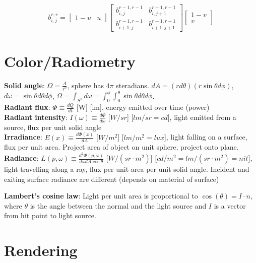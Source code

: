 \documentclass[9pt,landscape]{extarticle}
\begin{document}
\begin{multicols}{3}
$$b_{i,j}^{r,r} =
\begin{bmatrix}
    1 - u & u
\end{bmatrix}
\begin{bmatrix}
    b_{i, j}^{r-1, r-1} & b_{i, j+1}^{r-1, r-1} \\
    b_{i+1, j}^{r-1, r-1} & b_{i+1, j+1}^{r-1, r-1}
\end{bmatrix}
\begin{bmatrix}
    1 - v \\
    v
\end{bmatrix}$$


\section{Color/Radiometry}

\textbf{Solid angle}: $\Omega = \frac{A}{r^2}$, sphere has $4\pi$ steradians. $dA = (r d\theta)(r \sin\theta d\phi)$, $d\omega = \sin\theta d\theta d\phi$, $\Omega = \int_{S^2} d\omega = \int_0^{\phi} \int_0^{\theta} \sin\theta d\theta d\phi$. \\
\textbf{Radiant flux}: $\Phi \equiv \frac{dQ}{dt}$ [W] [lm], energy emitted over time (power) \\
\textbf{Radiant intensity}: $I(\omega) \equiv \frac{d\Phi}{d\omega}$ [$W/sr$] [$lm/sr=cd$], light emitted from a source, flux per unit solid angle \\
\textbf{Irradiance}: $E(x) \equiv \frac{d\Phi(x)}{dA}$ [$W/m^2$] [$lm/m^2=lux$], light falling on a surface, flux per unit area. Project area of object on unit sphere, project onto plane. \\
\textbf{Radiance}: $L(p, \omega) \equiv \frac{d^2\Phi(p, \omega)}{d\omega dA \cos\theta}$ [$W/(sr\cdot m^2)$] [$cd/m^2=lm/(sr\cdot m^2)=nit$], light travelling along a ray, flux per unit area per unit solid angle. Incident and exiting surface radiance are different (depends on material of surface)

\textbf{Lambert's cosine law}: Light per unit area is proportional to $\cos(\theta) = I \cdot n$, where $\theta$ is the angle between the normal and the light source and $I$ is a vector from hit point to light source.



\section{Rendering}


\end{multicols}
\end{document}
